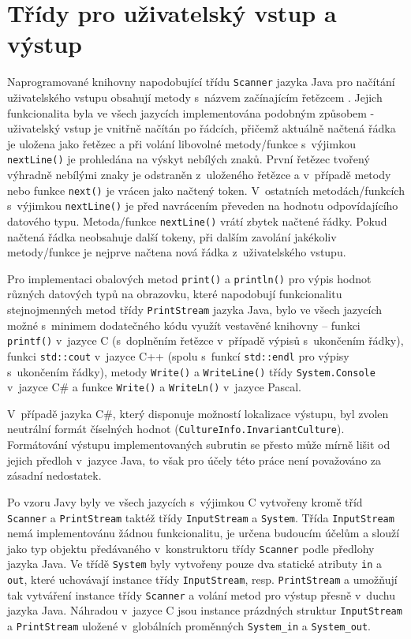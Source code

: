 \documentclass[czech,BP]{thesiskiv}
\begin{document}
\section{Třídy pro uživatelský vstup a výstup}
Naprogramované knihovny napodobující třídu \texttt{Scanner} jazyka Java pro načítání uživatelského vstupu obsahují metody s~názvem začínajícím řetězcem . Jejich funkcionalita byla ve všech jazycích implementována podobným způsobem - uživatelský vstup je vnitřně načítán po řádcích, přičemž aktuálně načtená řádka je uložena jako řetězec a při volání libovolné metody/funkce s~výjimkou \texttt{nextLine()} je prohledána na výskyt nebílých znaků. První řetězec tvořený výhradně nebílými znaky je odstraněn z~uloženého řetězce a v~případě metody nebo funkce \texttt{next()} je vrácen jako načtený token. V~ostatních metodách/funkcích s~výjimkou \texttt{nextLine()} je před navrácením převeden na hodnotu odpovídajícího datového typu. Metoda/funkce \texttt{nextLine()} vrátí zbytek načtené řádky. Pokud načtená řádka neobsahuje další tokeny, při dalším zavolání jakékoliv metody/funkce  je nejprve načtena nová řádka z~uživatelského vstupu.\par
Pro implementaci obalových metod \texttt{print()} a \texttt{println()} pro výpis hodnot různých datových typů na obrazovku, které napodobují funkcionalitu stejnojmenných metod třídy \texttt{PrintStream} jazyka Java, bylo ve všech jazycích možné s~minimem dodatečného kódu využít vestavěné knihovny -- funkci \texttt{printf()} v~jazyce C (s~doplněním řetězce  v~případě výpisů s~ukončením řádky), funkci \texttt{std::cout} v~jazyce C++ (spolu s~funkcí \texttt{std::endl} pro výpisy s~ukončením řádky), metody \texttt{Write()} a \texttt{WriteLine()} třídy \texttt{System.Console} v~jazyce C\# a funkce \texttt{Write()} a \texttt{WriteLn()} v~jazyce Pascal.\par
V~případě jazyka C\#, který disponuje možností lokalizace výstupu, byl zvolen neutrální formát číselných hodnot (\texttt{CultureInfo.InvariantCulture}). Formátování výstupu implementovaných subrutin se přesto může mírně lišit od jejich předloh v~jazyce Java, to však pro účely této práce není považováno za zásadní nedostatek.\par
Po vzoru Javy byly ve všech jazycích s~výjimkou C vytvořeny kromě tříd \texttt{Scanner} a \texttt{PrintStream} taktéž třídy \texttt{InputStream} a \texttt{System}. Třída \texttt{InputStream} nemá implementovánu žádnou funkcionalitu, je určena budoucím účelům a slouží jako typ objektu předávaného v~konstruktoru třídy \texttt{Scanner} podle předlohy jazyka Java. Ve třídě \texttt{System} byly vytvořeny pouze dva statické atributy \texttt{in} a \texttt{out}, které uchovávají instance třídy \texttt{InputStream}, resp. \texttt{PrintStream} a umožňují tak vytváření instance třídy \texttt{Scanner} a volání metod pro výstup přesně v~duchu jazyka Java. Náhradou v~jazyce C jsou instance prázdných struktur \texttt{InputStream} a \texttt{PrintStream} uložené v~globálních proměnných \texttt{System\_in} a \texttt{System\_out}.
\end{document}
